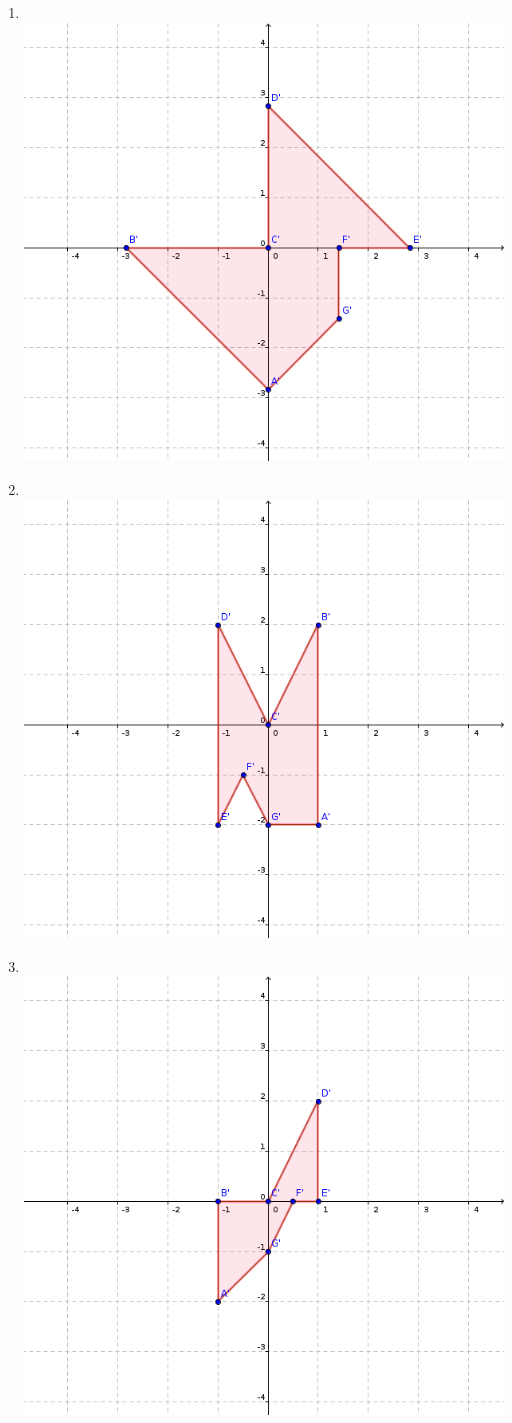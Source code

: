 \documentclass[a4paper]{article}
\begin{document}
\begin{enumerate}
\begin{multicols}{2}
\begin{enumerate} [label=(\alph*)]
		\item ~\vspace{-5mm} \\ \includegraphics[width=0.7\linewidth]{images/7}
		\item ~\vspace{-5mm}\\ \includegraphics[width=0.7\linewidth]{images/8}
		\item ~\vspace{-5mm} \\ \includegraphics[width=0.7\linewidth]{images/9}

\end{enumerate}
\end{multicols}
\end{enumerate}
\end{document}

